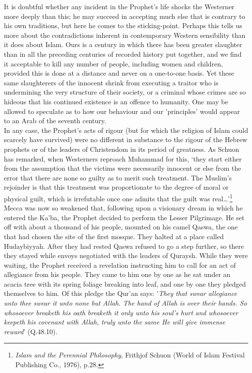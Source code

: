 \documentclass[10pt, twoside]{book}
\begin{document}
It is doubtful whether any incident in the Prophet's life shocks the Westerner more deeply than this; 
he may succeed in accepting much else that is contrary to his own traditions, but here he comes to 
the sticking\hyp{}point. Perhaps this tells us more about the contradictions inherent in contemporary 
Western sensibility than it does about Islam. Ours is a century in which there has been greater 
slaughter than in all the preceding centuries of recorded history put together, and we find it 
acceptable to kill any number of people, including women and children, provided this is done at a 
distance and never on a one\hyp{}to\hyp{}one basis. Yet these same slaughterers of the innocent shrink from 
executing a traitor who is undermining the very structure of their society, or a criminal whose 
crimes are so hideous that his continued existence is an offence to humanity. One may be allowed to 
speculate as to how our behaviour and our 'principles' would appear to an Arab of the seventh 
century. \\

In any case, the Prophet's acts of rigour (but for which the religion of Islam could scarcely have 
survived) were no different in substance to the rigour of the Hebrew prophets or of the leaders of 
Christendom in its period of greatness. As Schuon has remarked, when Westerners reproach Muhammad for 
this, `they start either from the assumption that the victims were necessarily innocent or else from 
the error that there are none so guilty as to merit such treatment. The Muslim's rejoinder is that 
this treatment was proportionate to the degree of moral or physical guilt, which is irrefutable once 
one admits that the guilt was real\ldots{}'\footnote{\emph{Islam and the Perennial Philosophy}, Frithjof Schuon (World of Islam Festival Publishing Co., 1976), p.28.}\\

Mecca was now so weakened that, following upon a visionary dream in which he entered the Ka'ba, the 
Prophet decided to perform the Lesser Pilgrimage. He set off with about a thousand of his people, 
mounted on his camel Qaswa, the one that had chosen the site of the first mosque. They halted at a 
place called Hudaybiyyah. After they had rested Qaswa refused to go a step further, so there they 
stayed while envoys negotiated with the leaders of Quraysh. While they were waiting, the Prophet 
received a revelation instructing him to call for an act of allegiance from his people. They came to 
him one by one as he sat under an acacia tree with its spring foliage breaking into leaf, and one by 
one they pledged themselves to him. Of this pledge the Qur'an says: '\emph{They that swear allegiance unto thee swear it unto none but Allah. The hand of Allah is over their hands. So whosoever breaketh his 
oath breaketh it only unto his soul's hurt and whosoever keepeth his covenant with Allah, truly unto 
the same He will give immense reward}' (Q.48.10). \\
\end{document}
